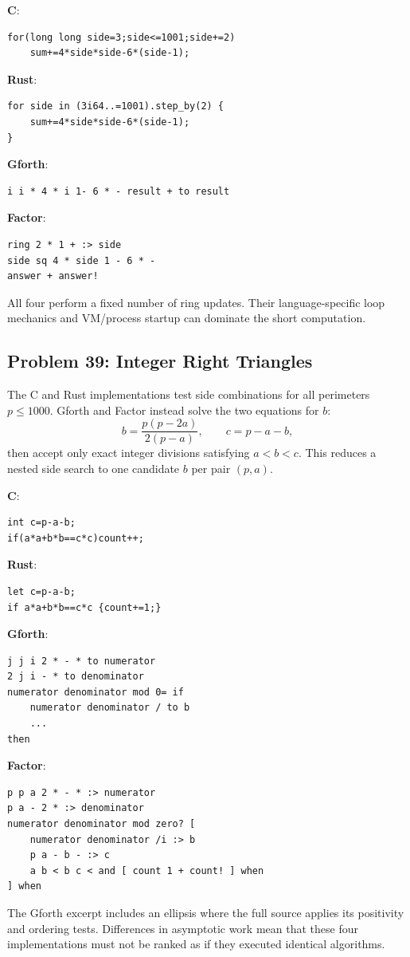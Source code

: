 \textbf{C}:
\begin{lstlisting}
for(long long side=3;side<=1001;side+=2)
    sum+=4*side*side-6*(side-1);
\end{lstlisting}
\textbf{Rust}:
\begin{lstlisting}
for side in (3i64..=1001).step_by(2) {
    sum+=4*side*side-6*(side-1);
}
\end{lstlisting}
\textbf{Gforth}:
\begin{lstlisting}
i i * 4 * i 1- 6 * - result + to result
\end{lstlisting}
\textbf{Factor}:
\begin{lstlisting}
ring 2 * 1 + :> side
side sq 4 * side 1 - 6 * -
answer + answer!
\end{lstlisting}
All four perform a fixed number of ring updates. Their language-specific
loop mechanics and VM/process startup can dominate the short computation.

\subsection{Problem 39: Integer Right Triangles}
The C and Rust implementations test side combinations for all perimeters
$p\leq1000$. Gforth and Factor instead solve the two equations for $b$:
\[
  b=\frac{p(p-2a)}{2(p-a)}, \qquad c=p-a-b,
\]
then accept only exact integer divisions satisfying $a<b<c$.
This reduces a nested side search to one candidate $b$ per pair $(p,a)$.

\textbf{C}:
\begin{lstlisting}
int c=p-a-b;
if(a*a+b*b==c*c)count++;
\end{lstlisting}
\textbf{Rust}:
\begin{lstlisting}
let c=p-a-b;
if a*a+b*b==c*c {count+=1;}
\end{lstlisting}
\textbf{Gforth}:
\begin{lstlisting}
j j i 2 * - * to numerator
2 j i - * to denominator
numerator denominator mod 0= if
    numerator denominator / to b
    ...
then
\end{lstlisting}
\textbf{Factor}:
\begin{lstlisting}
p p a 2 * - * :> numerator
p a - 2 * :> denominator
numerator denominator mod zero? [
    numerator denominator /i :> b
    p a - b - :> c
    a b < b c < and [ count 1 + count! ] when
] when
\end{lstlisting}
The Gforth excerpt includes an ellipsis where the full source applies its
positivity and ordering tests. Differences in asymptotic work mean that
these four implementations must not be ranked as if they executed
identical algorithms.


